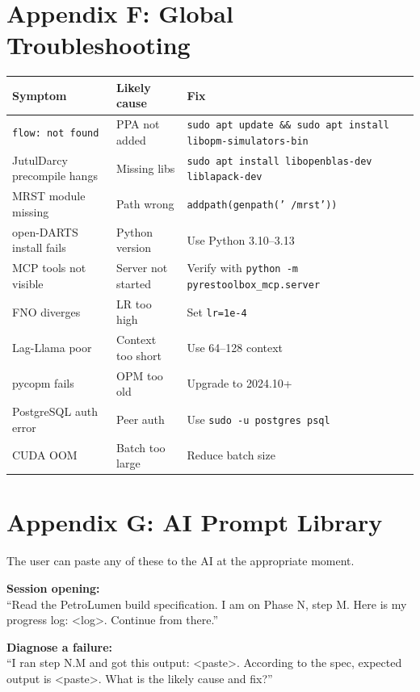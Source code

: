 \documentclass[10pt,a4paper]{article}
\newcommand{\cmd}[1]{\texttt{#1}}
\begin{document}
\section{Appendix F: Global Troubleshooting}

\begin{longtable}{@{}p{4.4cm}p{4.4cm}p{4.4cm}@{}}
\toprule
Symptom & Likely cause & Fix\\
\midrule
\endhead
\cmd{flow: not found} & PPA not added & \cmd{sudo apt update \&\& sudo apt install libopm-simulators-bin}\\
JutulDarcy precompile hangs & Missing libs & \cmd{sudo apt install libopenblas-dev liblapack-dev}\\
MRST module missing & Path wrong & \cmd{addpath(genpath('~/mrst'))}\\
open-DARTS install fails & Python version & Use Python 3.10--3.13\\
MCP tools not visible & Server not started & Verify with \cmd{python -m pyrestoolbox\_mcp.server}\\
FNO diverges & LR too high & Set \cmd{lr=1e-4}\\
Lag-Llama poor & Context too short & Use 64--128 context\\
pycopm fails & OPM too old & Upgrade to 2024.10+\\
PostgreSQL auth error & Peer auth & Use \cmd{sudo -u postgres psql}\\
CUDA OOM & Batch too large & Reduce batch size\\
\bottomrule
\end{longtable}

\section{Appendix G: AI Prompt Library}

The user can paste any of these to the AI at the appropriate moment.

\begin{aiprompt}
\textbf{Session opening:}\\
``Read the PetroLumen build specification. I am on Phase N, step M. Here is my progress log: <log>. Continue from there.''
\end{aiprompt}

\begin{aiprompt}
\textbf{Diagnose a failure:}\\
``I ran step N.M and got this output: <paste>. According to the spec, expected output is <paste>. What is the likely cause and fix?''
\end{aiprompt}
\end{document}
